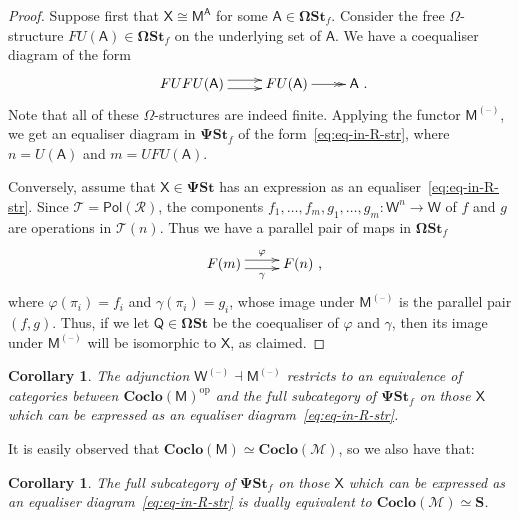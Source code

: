 \documentclass[11pt, a4paper, twoside,leqno]{amsart}
\def\blue{\leavevmode\color{blue}}%
\newcommand{\cat}[1]{\mathbf{#1}}
\newcommand{\thg}{{\mathord{\text{--}}}}
\newcommand{\cd}[2][]{\vcenter{\hbox{\xymatrix#1{#2}}}}
\numberwithin{equation}{section}
\theoremstyle{plain}
\newtheorem{Cor}[Thm]{Corollary}
\theoremstyle{definition}
\begin{document}
\begin{proof}
  Suppose first that $\mathsf{X} \cong \mathsf{M}^{\mathsf{A}}$ for
  some $\mathsf{A} \in \cat{\Omega St}_{f}$.
  Consider the free \(\Omega\)-structure
  $FU(\mathsf{A})  \in \cat{\Omega St}_{f}$ on the underlying set of
  \(\mathsf{A}\).
   We have a coequaliser diagram of
  the form
  \begin{equation*}
    \cd{
      FUFU(\mathsf{A}) \ar@<3pt>[r]^-{} \ar@<-3pt>[r]_-{} & FU(\mathsf{A}) \ar@{->>}[r]^-{} & \mathsf{A}
      \rlap{ .}
    }
  \end{equation*}
  Note that all of these
  \(\Omega\)-structures are indeed finite. 
  Applying the functor $\mathsf{M}^{(\thg)}$, we get an equaliser
  diagram in $\cat{\Psi St}_{f}$ of the form~\eqref{eq:eq-in-R-str},
  where $n = U(\mathsf{A})$ and
  \(m = UFU(\mathsf{A})\).

  Conversely, assume that $\mathsf{X} \in \cat{\Psi St}$ has an expression as an
  equaliser~\eqref{eq:eq-in-R-str}. Since $\mathscr{T}
  = \mathsf{Pol}(\mathscr{R}
  )$, the
  components $f_1, \dots, f_m, g_1, \dots, g_m \colon \mathsf{W}^n \rightarrow
  \mathsf{W}$ of $f$ and $g$ are operations in $\mathscr{T}
  (n)$. Thus we have a
  parallel pair of maps in $\cat{\Omega St}_{f}$
  \begin{equation*}
    \cd{
      F(m) \ar@<3pt>[r]^-{\varphi} \ar@<-3pt>[r]_-{\gamma} & F(n)\rlap{ ,}
    }
  \end{equation*}
  where $\varphi(\pi_i) = f_i$ and $\gamma(\pi_i) = g_i$, whose image
  under $\mathsf{M}^{(\thg)}$ is the parallel pair $(f,g)$. Thus, if
  we let $\mathsf{Q} \in \cat{\Omega St}$ be the coequaliser of $\varphi$ and
  $\gamma$, then its image under $\mathsf{M}^{(\thg)}$ will be
  isomorphic to $\mathsf{X}$, as claimed.
\end{proof}

\begin{Cor}
  \label{cor:adj-M-W-restr-equiv}
  The adjunction $\mathsf{W}^{(\thg)} \dashv \mathsf{M}^{(\thg)}$
  restricts to an equivalence of categories between
  \(\cat{Coclo}(\mathsf{M})^{\mathrm{op}}\) and the full subcategory of \(\cat{\Psi St}_{f}\) on
  those $\mathsf{X}$ which can be expressed as an equaliser
  diagram~\eqref{eq:eq-in-R-str}.
\end{Cor}

It is easily observed that  \(\cat{Coclo(\mathsf{M})} \simeq
\cat{Coclo(\mathcal{M})} \), so we also have that:
\begin{Cor}
  \label{cor:dual-S-W}
  The full subcategory of \(\cat{\Psi St}_{f}\) on
  those $\mathsf{X}$ which can be expressed as an equaliser
  diagram~\eqref{eq:eq-in-R-str} is dually equivalent to
  \(\cat{Coclo}(\mathcal{M}) \simeq \cat{S}\).
\end{Cor}
\end{document}
